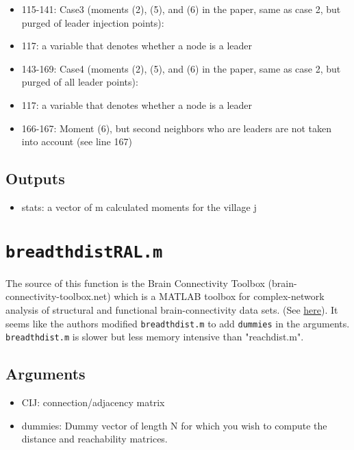 \documentclass[10pt,letterpaper]{article}
\begin{document}
\begin{itemize}
\begin{itemize}
      \item 115-141: Case3 (moments (2), (5), and (6) in the paper, same as case 2, but purged of leader injection points):
          \item 117: a variable that denotes whether a node is a leader
      \item 143-169: Case4 (moments (2), (5), and (6) in the paper, same as case 2, but purged of all leader points):
          \item 117: a variable that denotes whether a node is a leader
          \item 166-167: Moment (6), but second neighbors who are leaders are not taken into account (see line 167)
    \end{itemize}
\end{itemize}

\subsection*{Outputs}
\begin{itemize}
	\item stats: a vector of m calculated moments for the village j
\end{itemize}

\section{\texttt{breadthdistRAL.m}}\label{breadthdistRAL}

The source of this function is the Brain Connectivity Toolbox (brain-connectivity-toolbox.net) which is a MATLAB toolbox for complex-network analysis of structural and functional brain-connectivity data sets. (See \href{https://sites.google.com/site/bctnet/}{here}). It seems like the authors modified \texttt{breadthdist.m} to add \texttt{dummies} in the arguments. \texttt{breadthdist.m} is slower but less memory intensive than "reachdist.m".

\subsection*{Arguments}
\begin{itemize}
	\item CIJ: connection/adjacency matrix
	\item dummies: Dummy vector of length N for which you wish to compute the distance and reachability matrices.
\end{itemize}
\end{document}
